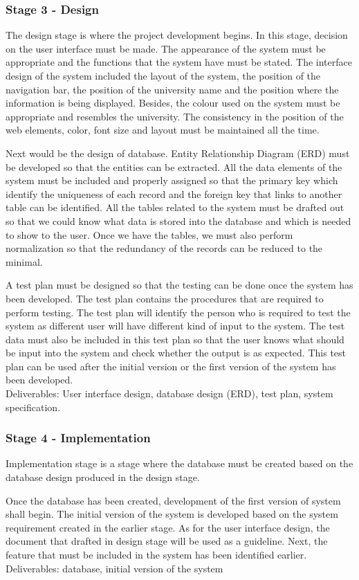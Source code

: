 \documentclass{article}
\begin{document}
\subsubsection{Stage 3 - Design}
\par The design stage is where the project development begins. In this stage, decision on the
user interface must be made. The appearance of the system must be appropriate and the functions
that the system have must be stated. The interface design of the system included the layout of the
system,  the position of the navigation bar, the position of the university name and the position where the information is being displayed. Besides, the colour used on the system must be appropriate and resembles the university. The
consistency in the position of the web elements, color, font size and layout must be maintained all the time.
\par Next would be the design of database. Entity Relationship Diagram (ERD) must be
developed so that the entities can be extracted. All the data elements of the system must be
included and properly assigned so that the primary key which identify the uniqueness of each
record and the foreign key that links to another table can be identified. All the tables related to
the system must be drafted out so that we could know what data is stored into the database and
which is needed to show to the user. Once we have the tables, we must also perform
normalization so that the redundancy of the records can be reduced to the minimal.
\par A test plan must be designed so that the testing can be done once the system has been
developed. The test plan contains the procedures that are required to perform testing. The test
plan will identify the person who is required to test the system as different user will have
different kind of input to the system. The test data must also be included in this test plan so that
the user knows what should be input into the system and check whether the output is as expected.
This test plan can be used after the initial version or the first version of the system has been
developed.\\
Deliverables: User interface design, database design (ERD), test plan, system specification.
\subsubsection{Stage 4 - Implementation}
\par Implementation stage is a stage where the database must be created based on the database
design produced in the design stage.
\par Once the database has been created, development of the first version of system shall begin. The
initial version of the system is developed based on the system requirement created in the earlier
stage. As for the user interface design, the document that drafted in design stage will be used as a
guideline. Next, the feature that must be included in the system has been identified earlier.\\
Deliverables: database, initial version of  the system
\end{document}
